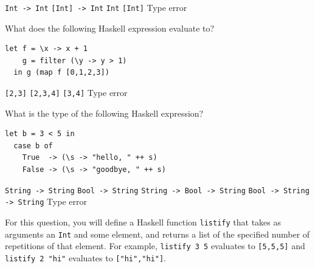 \documentclass[addpoints]{exam}
\begin{document}
\begin{questions}
\begin{choices}
  \choice \texttt{Int -> Int}
  \choice \texttt{[Int] -> Int}
  \CorrectChoice \texttt{Int}
  \choice \texttt{[Int]}
  \choice Type error
\end{choices}

\question[5] What does the following Haskell expression evaluate to?
\begin{verbatim}
let f = \x -> x + 1
    g = filter (\y -> y > 1)
  in g (map f [0,1,2,3])
\end{verbatim}

\begin{choices}
  \choice \texttt{[2,3]}
  \CorrectChoice \texttt{[2,3,4]}
  \choice \texttt{[3,4]}
  \choice Type error
\end{choices}

\newpage

\question[5] What is the type of the following Haskell expression?
\begin{verbatim}
let b = 3 < 5 in
  case b of
    True  -> (\s -> "hello, " ++ s)
    False -> (\s -> "goodbye, " ++ s)
\end{verbatim}

\begin{choices}
  \CorrectChoice \texttt{String -> String}
  \choice \texttt{Bool -> String}
  \choice \texttt{String -> Bool -> String}
  \choice \texttt{Bool -> String -> String}
  \choice Type error
\end{choices}

\question For this question, you will define a Haskell function \texttt{listify} that takes as arguments an \texttt{Int} and some element, and returns a list of the specified number of repetitions of that element.  For example, \texttt{listify 3 5} evaluates to \texttt{[5,5,5]} and \texttt{listify 2 "hi"} evaluates to \texttt{["hi","hi"]}.

\end{questions}
\end{document}
